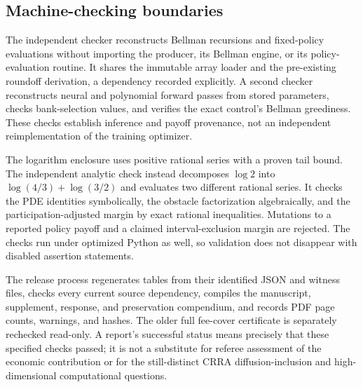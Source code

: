 \subsection{Machine-checking boundaries}
The independent checker reconstructs Bellman recursions and fixed-policy evaluations without importing the producer, its Bellman engine, or its policy-evaluation routine. It shares the immutable array loader and the pre-existing roundoff derivation, a dependency recorded explicitly. A second checker reconstructs neural and polynomial forward passes from stored parameters, checks bank-selection values, and verifies the exact control's Bellman greediness. These checks establish inference and payoff provenance, not an independent reimplementation of the training optimizer.

The logarithm enclosure uses positive rational series with a proven tail bound. The independent analytic check instead decomposes $\log2$ into $\log(4/3)+\log(3/2)$ and evaluates two different rational series. It checks the PDE identities symbolically, the obstacle factorization algebraically, and the participation-adjusted margin by exact rational inequalities. Mutations to a reported policy payoff and a claimed interval-exclusion margin are rejected. The checks run under optimized Python as well, so validation does not disappear with disabled assertion statements.

The release process regenerates tables from their identified JSON and witness files, checks every current source dependency, compiles the manuscript, supplement, response, and preservation compendium, and records PDF page counts, warnings, and hashes. The older full fee-cover certificate is separately rechecked read-only. A report's successful status means precisely that these specified checks passed; it is not a substitute for referee assessment of the economic contribution or for the still-distinct CRRA diffusion-inclusion and high-dimensional computational questions.
